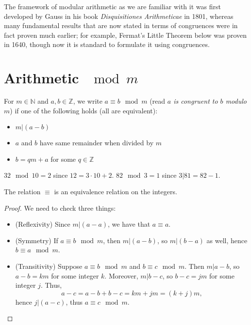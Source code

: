 \documentclass[11pt,dvipsnames]{book}
\numberwithin{equation}{section} %
\numberwithin{figure}{section} %
\numberwithin{table}{section} %
\begin{document}
\begin{exercise}
The framework of modular arithmetic as we are familiar with it was first developed by Gauss in his book {\it  Disquisitiones Arithmeticae} in 1801, whereas many fundamental results that are now stated in terms of congruences were in fact proven much earlier; for example, Fermat's Little Theorem below was proven in 1640, though now it is standard to formulate it using congruences. 


\section{Arithmetic $\mod m$}

\begin{definition}
\label{d:mod}
For $m\in \mathbb{N}$ and $a,b\in \mathbb{Z}$, we write  {\color{magenta} $a\equiv b\mod m$} (read {\it $a$ is congruent to $b$ modulo $m$}) if one of the following holds (all are equivalent):
 
\begin{itemize}
\item $m|(a-b)$ 
 
\item $a$ and $b$ have same remainder when divided by $m$ 
\item $b=qm+a$ for some $q\in \mathbb{Z}$ 
\end{itemize}

\end{definition}

\begin{example}
$32\mod 10 = 2$ since $12=3\cdot 10+2$. $82 \mod 3=1$ since $3| 81=82-1$. 
\end{example}
 
\begin{theorem}
The relation $\equiv $ is an equivalence relation on the integers.
\end{theorem}

\begin{proof}
We need to check three things:
\begin{itemize}
\item (Reflexivity) Since $m|(a-a)$, we have that $a\equiv a$.
\item (Symmetry) If $a\equiv b\mod m$, then $m|(a-b)$, so $m|(b-a)$ as well, hence $b\equiv a \mod m$. 
\item (Transitivity) Suppose $a\equiv b \mod m$ and $b\equiv c\mod m$. Then $m|a-b$, so $a-b=km$ for some integer $k$. Moreover, $m|b-c$, so $b-c=jm$ for some integer $j$. Thus,
\[
a-c = a-b+b-c = km+jm = (k+j)m,\]
hence $j|(a-c)$, thus $a\equiv c \mod m$. 
\end{itemize}
\end{proof}


\end{exercise}
\end{document}
